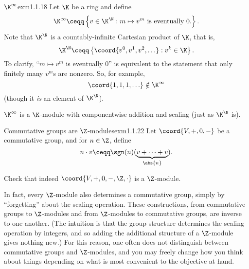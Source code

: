 \begin{exm}{$\K ^{\infty}$}{exm1.1.18}
	Let $\K$ be a ring and define
	\begin{equation}
		\K ^{\infty}\ceqq \left\{ v\in \K ^{\N}:m\mapsto v^m\text{ is eventually }0\text{.}\right\} .
	\end{equation}\index[notation]{$\K ^{\infty}$}
	Note that $\K ^{\N}$ is a countably-infinite Cartesian product of $\K$, that is,
	\begin{equation}
		\K ^{\N}\ceqq \left\{ \coord{v^0,v^1,v^2,\ldots }:v^k\in \K \right\} .
	\end{equation}
	To clarify, ``$m\mapsto v^m$ is eventually $0$'' is equivalent to the statement that only finitely many $v^m$s are nonzero.  So, for example,
	\begin{equation}
		\coord{1,1,1,\ldots }\notin \K ^{\infty}
	\end{equation}
	(though it \emph{is} an element of $\K ^{\N}$).
	
	$\K ^{\infty}$ is a $\K$-module with componentwise addition and scaling (just as $\K ^{\N}$ is).
\end{exm}
\begin{exm}{Commutative groups are $\Z$-modules}{exm1.1.22}
	Let $\coord{V,+,0,-}$ be a commutative group, and for $n\in \Z$, define
	\begin{equation}
		n\cdot v\ceqq \sgn (n) (\underbrace{v+\cdots +v}_{\abs{n}}).
	\end{equation}
	\begin{exr}[breakable=false]{}{}
		Check that indeed $\coord{V,+,0,-,\Z ,\cdot}$ is a $\Z$-module.
	\end{exr}
	\begin{rmk}
		In fact, every $\Z$-module also determines a commutative group, simply by ``forgetting'' about the scaling operation.  These constructions, from commutative groups to $\Z$-modules and from $\Z$-modules to commutative groups, are inverse to one another.  (The intuition is that the group structure determines the scaling operation by integers, and so adding the additional structure of a $\Z$-module gives nothing new.)  For this reason, one often does not distinguish between commutative groups and $\Z$-modules, and you may freely change how you think about things depending on what is most convenient to the objective at hand.
	\end{rmk}
\end{exm}

